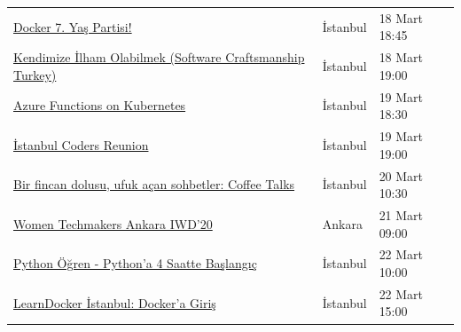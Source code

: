 \documentclass[11pt]{article}
\begin{document}
\begin{longtable}{|p{8cm}|l|l|}
\href{https://kommunity.com/devops-turkiye/events/docker-7-yas-partisi}{Docker 7. Yaş Partisi!} & İstanbul & 18 Mart 18:45\\
\href{https://kommunity.com/software-craftsmanship-turkey/events/scturkey-meetup}{Kendimize İlham Olabilmek (Software Craftsmanship Turkey)} & İstanbul & 18 Mart 19:00\\
\href{https://kommunity.com/cloud-and-serverless-turkey/events/azure-functions-on-kubernetes-istanbul}{Azure Functions on Kubernetes} & İstanbul & 19 Mart 18:30\\
\href{https://www.meetup.com/Istanbul-Hackers/events/268972005/}{İstanbul Coders Reunion} & İstanbul & 19 Mart 19:00\\
\href{https://kommunity.com/setur/events/bir-fincan-dolusu-ufuk-acan-sohbetler-coffee-talks}{Bir fincan dolusu, ufuk açan sohbetler: Coffee Talks} & İstanbul & 20 Mart 10:30\\
\href{https://www.meetup.com/GDGAnkara/events/268276284/}{Women Techmakers Ankara IWD'20} & Ankara & 21 Mart 09:00\\
\href{https://www.meetup.com/ING-\%25C4\%25B0novasyon-Merkezi/events/269254711/}{Python Öğren - Python'a 4 Saatte Başlangıç} & İstanbul & 22 Mart 10:00\\
\href{https://www.meetup.com/ING-\%25C4\%25B0novasyon-Merkezi/events/269254823/}{LearnDocker İstanbul: Docker'a Giriş} & İstanbul & 22 Mart 15:00\\
\hline
\end{longtable}
\end{document}
